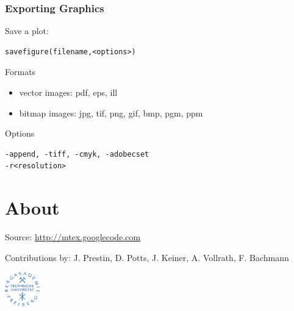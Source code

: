 \documentclass{beamer}
\newcommand{\MTEX}{{\bf {\color{red}M}TEX\,}}%
\begin{document}
\begin{frame}[fragile]
  \frametitle{Exporting Graphics}
    Save a plot:
\begin{lstlisting}
savefigure(filename,<options>)
\end{lstlisting}

    \begin{block}{Formats}
      \begin{itemize}
      \item vector images: pdf, eps, ill 
      \item bitmap images: jpg, tif, png, gif, bmp, pgm, ppm
      \end{itemize}

    \end{block}

    \begin{block}{Options}
\begin{lstlisting}
-append, -tiff, -cmyk, -adobecset
-r<resolution> 
\end{lstlisting}
    \end{block}
\end{frame}

\section{About}

\begin{frame}

  \author{}
  \date{}
  \institute{}
  \titlegraphic{}  
  \maketitle

  \vskip -2cm

  \begin{block}{Source:}
    \url{http://mtex.googlecode.com}
  \end{block}

  \begin{block}{Contributions by:}
    J. Prestin, D. Potts, J. Keiner, A. Vollrath, F. Bachmann
  \end{block}

  \bigskip

  \centerline{\includegraphics[width=1.5cm]{pic/tu_logo}}




\end{frame}

  
\end{document}
